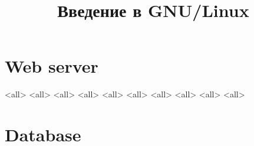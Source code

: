 

\title{Введение в GNU/Linux}




\begin{frame}
	\frametitle{}
	\titlepage
	\vspace{-0.5cm}
	\begin{center}
	\end{center}
\end{frame}


\begin{frame}
	\tableofcontents
	[hideallsubsections]
\end{frame}


\section{Web server}
\mode<all>{}
\mode<all>{}
\mode<all>{}
\mode<all>{}
\mode<all>{}
\mode<all>{}
\mode<all>{}
\mode<all>{}
\mode<all>{}
\mode<all>{}

\section{Database}


